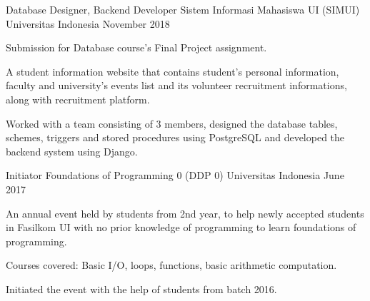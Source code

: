 \begin{cventries}
  \cventry
    {Database Designer, Backend Developer} %
    {Sistem Informasi Mahasiswa UI (SIMUI)} %
    {Universitas Indonesia} %
    {November 2018} %
    {
      \begin{cvitems} %
      	\item Submission for Database course's Final Project assignment.
		\item A student information website that contains student's personal information, faculty and university's events list and its volunteer recruitment informations, along with recruitment platform. 
		\item Worked with a team consisting of 3 members, designed the database tables, schemes, triggers and stored procedures using PostgreSQL and developed the backend system using Django.
      \end{cvitems}
    }
    
  \cventry
    {Initiator} %
    {Foundations of Programming 0 (DDP 0)} %
    {Universitas Indonesia} %
    {June 2017} %
    {
      \begin{cvitems} %
		\item An annual event held by students from 2nd year, to help newly accepted students in Fasilkom UI with no prior knowledge of programming to learn foundations of programming.
		\item Courses covered: Basic I/O, loops, functions, basic arithmetic computation.
		\item Initiated the event with the help of students from batch 2016.
      \end{cvitems}
    }
\end{cventries}